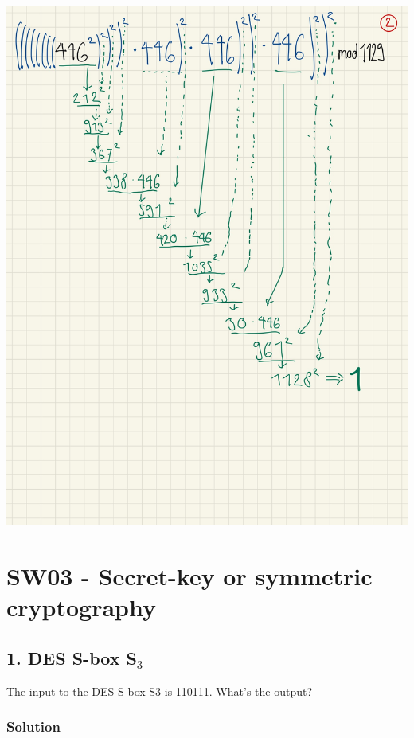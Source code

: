 \documentclass[11pt]{article}
\begin{document}
\includegraphics{img/legendre2.jpg}

    
\newpage 

    \hypertarget{sw03---secret-key-or-symmetric-cryptography}{%
\section{SW03 - Secret-key or symmetric
cryptography}\label{sw03---secret-key-or-symmetric-cryptography}}

    \hypertarget{des-s-box-s_3}{%
\subsection{\texorpdfstring{1. DES S-box
S\(_{3}\)}{1. DES S-box S\_\{3\}}}\label{des-s-box-s_3}}

The input to the DES S-box S3 is 110111. What's the output?

\hypertarget{solution}{%
\subsubsection{Solution}\label{solution}}
\end{document}
